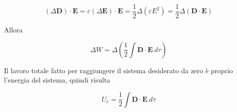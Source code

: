 \begin{equation*}
    (\Delta \mathbf{D}) \cdot \mathbf{E} = \varepsilon(\Delta \mathbf{E}) \cdot \mathbf{E} = \frac{1}{2} \Delta (\varepsilon E^2) = \frac{1}{2} \Delta (\mathbf{D} \cdot \mathbf{E})
\end{equation*}

Allora 

\begin{equation*}
    \Delta W = \Delta \left( \frac{1}{2} \int \mathbf{D} \cdot \mathbf{E} \ d \tau\right)
\end{equation*}

Il lavoro totale fatto per raggiungere il sistema desiderato da zero è proprio l'energia del sistema, quindi risulta 

\begin{tcolorbox}[colback=yellow!10!white, colframe=orange!70!black, boxrule=0.8pt]
\begin{equation}
    U_e = \frac{1}{2} \int \mathbf{D} \cdot \mathbf{E} \ d \tau
\end{equation}
\end{tcolorbox}
